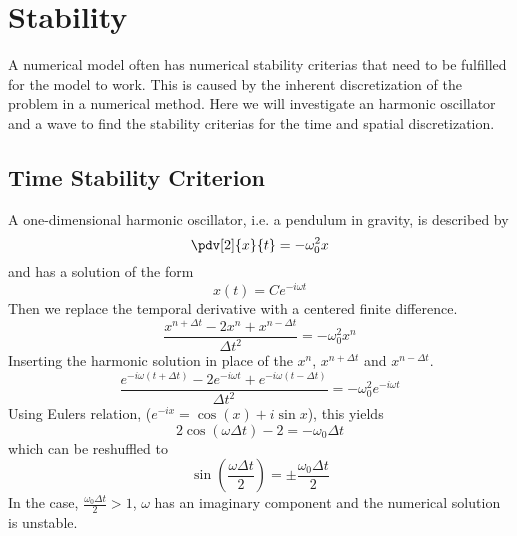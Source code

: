 \section{Stability}
    A numerical model often has numerical stability criterias that need to be fulfilled
    for the model to work. This is caused by the inherent discretization of the problem
    in a numerical method. Here we will investigate an harmonic oscillator and a
    wave to find the stability criterias for the time and spatial discretization.

    \subsection{Time Stability Criterion}
        A one-dimensional harmonic oscillator, i.e. a pendulum in gravity, is described by
        \begin{equation}
            \pdv[2]{x}{t} = - \omega_0^2 x
        \end{equation}
        and has a solution of the form
        \begin{equation}
            x(t) = C e^{-i\omega t} \label{eq:harmonic_sol}
        \end{equation}
        Then we replace the temporal derivative with a centered finite difference.
        \begin{equation}
            \frac{x^{n+\Delta t} - 2 x^{n} + x^{n-\Delta t}}{\Delta t^2} = -\omega_0^2 x^n
        \end{equation}
        Inserting the harmonic solution in place of the \(x^n\), \(x^{n+ \Delta t}\) and \(x^{n-\Delta t}\).
        \begin{equation}
            \frac{ e^{-i\omega (t + \Delta t)} -2e^{-i\omega t} + e^{-i\omega (t - \Delta t)}}{\Delta t^2} = -\omega_0^2 e^{-i\omega t}
        \end{equation}
        Using Eulers relation, (\(e^{-ix} = \cos(x) + i\sin{x}\)), this yields
        \begin{equation}
            2\cos(\omega \Delta t)- 2 = -\omega_0 \Delta t
        \end{equation}
        which can be reshuffled to
        \begin{equation}
                \sin(\frac{\omega \Delta t}{2}) = \pm \frac{\omega_0 \Delta t}{2}
        \end{equation}
        In the case, \(\frac{\omega_0 \Delta t}{2} > 1\), \(\omega\) has an imaginary component
        and the numerical solution is unstable.

